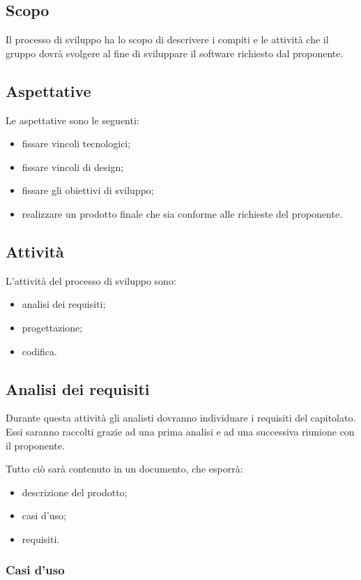 \subsection{Scopo}
Il processo di sviluppo ha lo scopo di descrivere i compiti e le attività che il gruppo dovrà svolgere al fine di sviluppare il software richiesto dal proponente.

\subsection{Aspettative}
Le aspettative sono le seguenti:
\begin{itemize}
    \item fissare vincoli tecnologici;
    \item fissare vincoli di design;
    \item fissare gli obiettivi di sviluppo;
    \item realizzare un prodotto finale che sia conforme alle richieste del proponente.
\end{itemize}

\subsection{Attività}

L'attività del processo di sviluppo sono:
\begin{itemize}
    \item analisi dei requisiti;
    \item progettazione;
    \item codifica.
\end{itemize}

\subsection{Analisi dei requisiti}
Durante questa attività gli analisti dovranno individuare i requisiti del capitolato. Essi saranno raccolti grazie ad una prima analisi e ad una successiva riunione con il proponente.

Tutto ciò sarà contenuto in un documento, che esporrà:
\begin{itemize}
    \item descrizione del prodotto;
    \item casi d'uso;
    \item requisiti.
\end{itemize}

\subsubsection{Casi d'uso}

